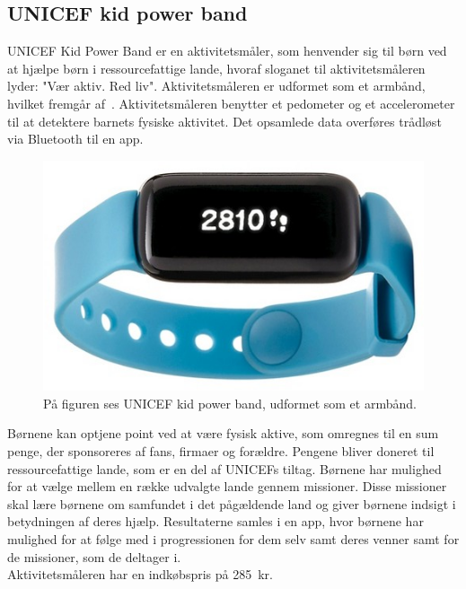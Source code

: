 \subsection{UNICEF kid power band}
UNICEF Kid Power Band er en aktivitetsmåler, som henvender sig til børn ved at hjælpe børn i ressourcefattige lande, hvoraf sloganet til aktivitetsmåleren lyder: "Vær aktiv. Red liv". Aktivitetsmåleren er udformet som et armbånd, hvilket fremgår af~. Aktivitetsmåleren benytter et pedometer og et accelerometer til at detektere barnets fysiske aktivitet. Det opsamlede data overføres trådløst via Bluetooth til en app. \citep{PowerAbout2015,PowerManual2015}
\begin{figure}[H]
	\centering
	\includegraphics[scale=0.32]{figures/aProblemanalyse/unicef.png}
	\caption{På figuren ses UNICEF kid power band, udformet som et armbånd.~\cite{Unicef2016}}
	\label{fig:unicef}
\end{figure}\vspace{-.25cm}
Børnene kan optjene point ved at være fysisk aktive, som omregnes til en sum penge, der sponsoreres af fans, firmaer og forældre. Pengene bliver doneret til ressourcefattige lande, som er en del af UNICEFs tiltag. 
Børnene har mulighed for at vælge mellem en række udvalgte lande gennem missioner. Disse missioner skal lære børnene om samfundet i det pågældende land og giver børnene indsigt i betydningen af deres hjælp. Resultaterne samles i en app, hvor børnene har mulighed for at følge med i progressionen for dem selv samt deres venner samt for de missioner, som de deltager i.~\citep{PowerAbout2015,PowerManual2015}\\
Aktivitetsmåleren har en indkøbspris på 285~kr.~\citep{Unicef2016}

